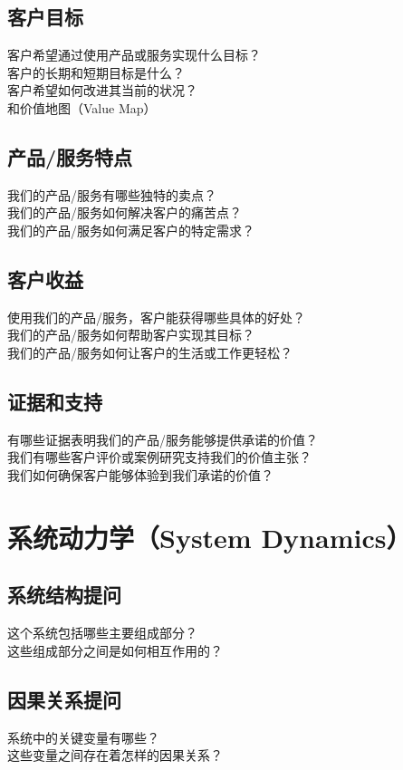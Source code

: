 \documentclass[12pt]{book}
\begin{document}
\subsection{客户目标}
客户希望通过使用产品或服务实现什么目标？\\
客户的长期和短期目标是什么？\\
客户希望如何改进其当前的状况？\\


和价值地图（Value Map）\\

\subsection{产品/服务特点}
我们的产品/服务有哪些独特的卖点？\\
我们的产品/服务如何解决客户的痛苦点？\\
我们的产品/服务如何满足客户的特定需求？\\


\subsection{客户收益}
使用我们的产品/服务，客户能获得哪些具体的好处？\\
我们的产品/服务如何帮助客户实现其目标？\\
我们的产品/服务如何让客户的生活或工作更轻松？\\

\subsection{证据和支持}
有哪些证据表明我们的产品/服务能够提供承诺的价值？\\
我们有哪些客户评价或案例研究支持我们的价值主张？\\
我们如何确保客户能够体验到我们承诺的价值？\\



\section{系统动力学（System Dynamics）}
\subsection{系统结构提问}
这个系统包括哪些主要组成部分？\\
这些组成部分之间是如何相互作用的？\\
\subsection{因果关系提问}
系统中的关键变量有哪些？\\
这些变量之间存在着怎样的因果关系？\\
\end{document}
